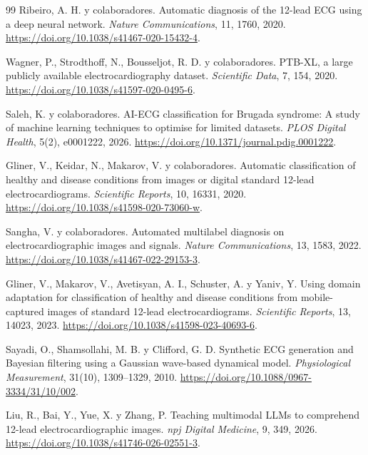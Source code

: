 \begin{thebibliography}{99}
Ribeiro, A. H. y colaboradores.
\newblock Automatic diagnosis of the 12-lead ECG using a deep neural network.
\newblock \emph{Nature Communications}, 11, 1760, 2020.
\newblock \url{https://doi.org/10.1038/s41467-020-15432-4}.

Wagner, P., Strodthoff, N., Bousseljot, R. D. y colaboradores.
\newblock PTB-XL, a large publicly available electrocardiography dataset.
\newblock \emph{Scientific Data}, 7, 154, 2020.
\newblock \url{https://doi.org/10.1038/s41597-020-0495-6}.

Saleh, K. y colaboradores.
\newblock AI-ECG classification for Brugada syndrome: A study of machine learning techniques to optimise for limited datasets.
\newblock \emph{PLOS Digital Health}, 5(2), e0001222, 2026.
\newblock \url{https://doi.org/10.1371/journal.pdig.0001222}.

Gliner, V., Keidar, N., Makarov, V. y colaboradores.
\newblock Automatic classification of healthy and disease conditions from images or digital standard 12-lead electrocardiograms.
\newblock \emph{Scientific Reports}, 10, 16331, 2020.
\newblock \url{https://doi.org/10.1038/s41598-020-73060-w}.

Sangha, V. y colaboradores.
\newblock Automated multilabel diagnosis on electrocardiographic images and signals.
\newblock \emph{Nature Communications}, 13, 1583, 2022.
\newblock \url{https://doi.org/10.1038/s41467-022-29153-3}.

Gliner, V., Makarov, V., Avetisyan, A. I., Schuster, A. y Yaniv, Y.
\newblock Using domain adaptation for classification of healthy and disease conditions from mobile-captured images of standard 12-lead electrocardiograms.
\newblock \emph{Scientific Reports}, 13, 14023, 2023.
\newblock \url{https://doi.org/10.1038/s41598-023-40693-6}.

Sayadi, O., Shamsollahi, M. B. y Clifford, G. D.
\newblock Synthetic ECG generation and Bayesian filtering using a Gaussian wave-based dynamical model.
\newblock \emph{Physiological Measurement}, 31(10), 1309--1329, 2010.
\newblock \url{https://doi.org/10.1088/0967-3334/31/10/002}.

Liu, R., Bai, Y., Yue, X. y Zhang, P.
\newblock Teaching multimodal LLMs to comprehend 12-lead electrocardiographic images.
\newblock \emph{npj Digital Medicine}, 9, 349, 2026.
\newblock \url{https://doi.org/10.1038/s41746-026-02551-3}.


\end{thebibliography}
